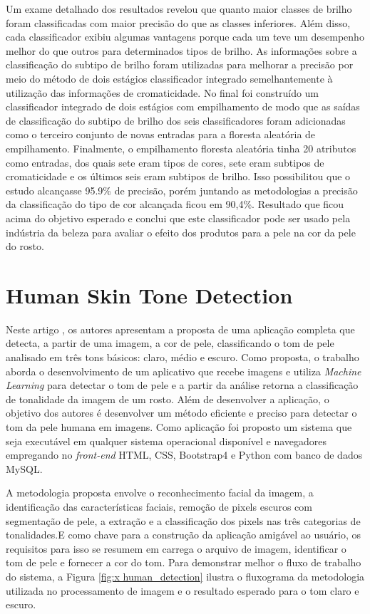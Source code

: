 Um exame detalhado dos resultados revelou que quanto maior classes de brilho foram classificadas com maior precisão do que as classes inferiores. Além disso, cada classificador exibiu algumas vantagens porque cada um teve um desempenho melhor do que outros para determinados tipos de brilho. As informações sobre a classificação do subtipo de brilho foram utilizadas para melhorar a precisão por meio do método de dois estágios classificador integrado semelhantemente à utilização das informações de cromaticidade. No final foi construído um classificador integrado de dois estágios com empilhamento de modo que as saídas de classificação do subtipo de brilho dos seis classificadores foram adicionadas como o terceiro conjunto de novas entradas para a floresta aleatória de empilhamento. Finalmente, o empilhamento floresta aleatória tinha 20 atributos como entradas, dos quais sete eram tipos de cores, sete eram subtipos de cromaticidade e os últimos seis eram subtipos de brilho.
Isso possibilitou que o estudo alcançasse 95.9\% de precisão, porém juntando as metodologias a precisão da classificação do tipo de cor alcançada ficou em 90,4\%. Resultado que ficou acima do objetivo esperado e conclui que este classificador pode ser usado pela indústria da beleza para avaliar o efeito dos produtos para a pele na cor da pele do rosto.


\section{Human Skin Tone Detection}

Neste artigo \cite{Human_Skin_Tone_Detection}, os autores apresentam a proposta de uma aplicação completa que detecta, a partir de uma imagem, a cor de pele, classificando o tom de pele analisado em três tons básicos: claro, médio e escuro. Como proposta, o trabalho aborda o desenvolvimento de um aplicativo que recebe imagens e utiliza \textit{Machine Learning} para detectar o tom de pele e a partir da análise retorna a classificação de tonalidade da imagem de um rosto. Além de desenvolver a aplicação, o objetivo dos autores é desenvolver um método eficiente e preciso para detectar o tom da pele humana em imagens. Como aplicação foi proposto um sistema que seja executável em qualquer sistema operacional disponível e navegadores empregando no \textit{front-end} HTML, CSS, Bootstrap4 e Python com banco de dados MySQL.

A metodologia proposta envolve o reconhecimento facial da imagem, a identificação das características faciais, remoção de pixels escuros com segmentação de pele, a extração e  a classificação dos pixels nas três categorias de tonalidades.E como chave para a construção da aplicação amigável ao usuário, os requisitos para isso se resumem em carrega o arquivo de imagem, identificar o tom de pele e fornecer a cor do tom. Para demonstrar melhor o fluxo de trabalho do sistema, a Figura \ref{fig:x human_detection} ilustra o fluxograma da metodologia utilizada no processamento de imagem e o resultado esperado para o tom claro e escuro.

